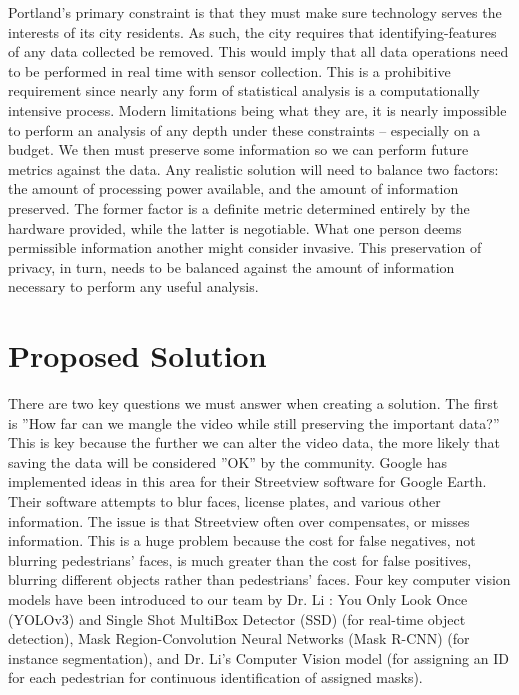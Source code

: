\documentclass[onecolumn, draftclsnofoot,10pt, compsoc]{IEEEtran}
\begin{document}
Portland's primary constraint is that they must make sure technology serves the interests of its city residents. As such, the city requires that identifying-features of any data collected be removed. This would imply that all data operations need to be performed in real time with sensor collection. This is a prohibitive requirement since nearly any form of statistical analysis is a computationally intensive process. Modern limitations being what they are, it is nearly impossible to perform an analysis of any depth under these constraints -- especially on a budget. We then must preserve some information so we can perform future metrics against the data. Any realistic solution will need to balance two factors: the amount of processing power available, and the amount of information preserved. The former factor is a definite metric determined entirely by the hardware provided, while the latter is negotiable. What one person deems permissible information another might consider invasive. This preservation of privacy, in turn, needs to be balanced against the amount of information necessary to perform any useful analysis.
\section{Proposed Solution}

There are two key questions we must answer when creating a solution. The first is ''How far can we mangle the video while still preserving the important data?'' This is key because the further we can alter the video data, the more likely that saving the data will be considered ''OK'' by the community. Google has implemented ideas in this area for their Streetview software for Google Earth. Their software attempts to blur faces, license plates, and various other information. The issue is that Streetview often over compensates, or misses information. This is a huge problem because the cost for false negatives, not blurring pedestrians' faces, is much greater than the cost for false positives, blurring different objects rather than pedestrians' faces. Four key computer vision models have been introduced to our team by Dr. Li \cite{li}: You Only Look Once (YOLOv3) \cite{YOLOv3} and Single Shot MultiBox Detector (SSD) \cite{SSD} (for real-time object detection), Mask Region-Convolution Neural Networks (Mask R-CNN) \cite{mask-r-cnn} (for instance segmentation), and Dr. Li's Computer Vision model \cite{li-model} (for assigning an ID for each pedestrian for continuous identification of assigned masks).
\end{document}
